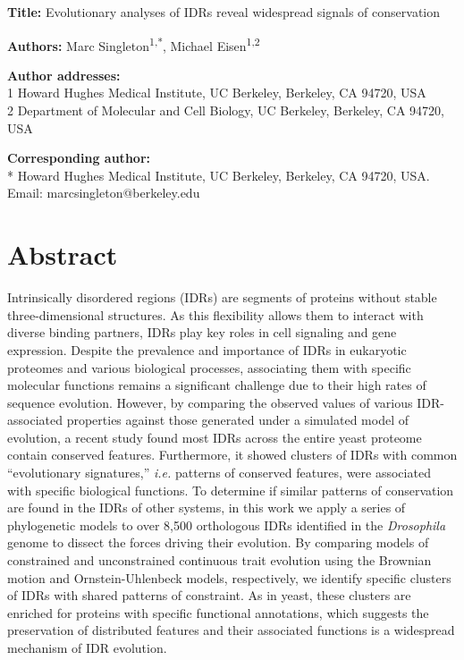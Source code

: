 \textbf{Title:} Evolutionary analyses of IDRs reveal widespread signals of conservation

\textbf{Authors:} Marc Singleton\textsuperscript{1,*}, Michael Eisen\textsuperscript{1,2}

\textbf{Author addresses:}\\
1 Howard Hughes Medical Institute, UC Berkeley, Berkeley, CA 94720, USA\\
2 Department of Molecular and Cell Biology, UC Berkeley, Berkeley, CA 94720, USA

\textbf{Corresponding author:}\\
* Howard Hughes Medical Institute, UC Berkeley, Berkeley, CA 94720, USA. Email: marcsingleton@berkeley.edu

\clearpage

\section{Abstract}
Intrinsically disordered regions (IDRs) are segments of proteins without stable three-dimensional structures. As this flexibility allows them to interact with diverse binding partners, IDRs play key roles in cell signaling and gene expression. Despite the prevalence and importance of IDRs in eukaryotic proteomes and various biological processes, associating them with specific molecular functions remains a significant challenge due to their high rates of sequence evolution. However, by comparing the observed values of various IDR-associated properties against those generated under a simulated model of evolution, a recent study found most IDRs across the entire yeast proteome contain conserved features. Furthermore, it showed clusters of IDRs with common ``evolutionary signatures,'' \textit{i.e.} patterns of conserved features, were associated with specific biological functions. To determine if similar patterns of conservation are found in the IDRs of other systems, in this work we apply a series of phylogenetic models to over 8,500 orthologous IDRs identified in the \textit{Drosophila} genome to dissect the forces driving their evolution. By comparing models of constrained and unconstrained continuous trait evolution using the Brownian motion and Ornstein-Uhlenbeck models, respectively, we identify specific clusters of IDRs with shared patterns of constraint. As in yeast, these clusters are enriched for proteins with specific functional annotations, which suggests the preservation of distributed features and their associated functions is a widespread mechanism of IDR evolution.

